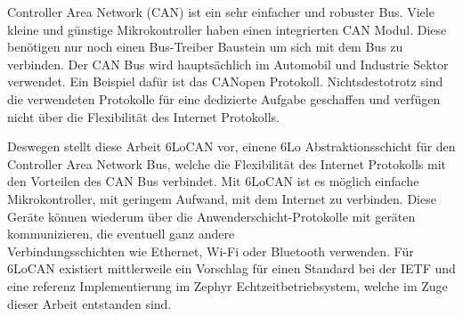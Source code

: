 Controller Area Network (CAN) ist ein sehr einfacher und robuster Bus.
Viele kleine und günstige Mikrokontroller haben einen integrierten CAN Modul.
Diese benötigen nur noch einen Bus-Treiber Baustein um sich mit dem Bus zu verbinden.
Der CAN Bus wird hauptsächlich im Automobil und Industrie Sektor verwendet.
Ein Beispiel dafür ist das CANopen Protokoll.
Nichtsdestotrotz sind die verwendeten Protokolle für eine dedizierte Aufgabe geschaffen und verfügen nicht über die Flexibilität des Internet Protokolls.

Deswegen stellt diese Arbeit 6LoCAN vor, einene 6Lo Abstraktionsschicht für den Controller Area Network Bus,
welche die Flexibilität des Internet Protokolls mit den Vorteilen des CAN Bus verbindet.
Mit 6LoCAN ist es möglich einfache Mikrokontroller, mit geringem Aufwand, mit dem Internet zu verbinden.
Diese Geräte können wiederum über die Anwenderschicht-Protokolle mit geräten kommunizieren,
die eventuell ganz andere \\Verbindungsschichten wie Ethernet, Wi-Fi oder Bluetooth verwenden.
Für 6LoCAN existiert mittlerweile ein Vorschlag für einen Standard bei der IETF und eine referenz Implementierung im Zephyr Echtzeitbetriebsystem,
welche im Zuge dieser Arbeit entstanden sind.
